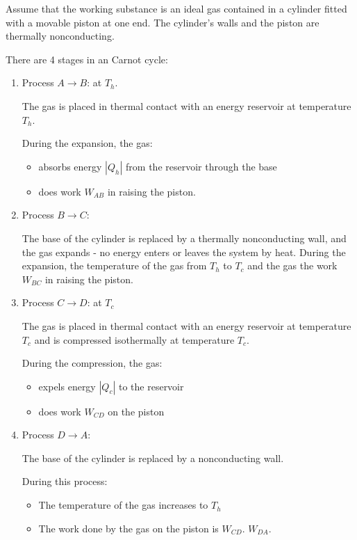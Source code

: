        \par Assume that the working substance is an ideal gas contained in a cylinder
        fitted with a movable piston at one end. The cylinder's walls and the piston
        are thermally nonconducting.
        \par There are 4 stages in an Carnot cycle:
        \begin{enumerate}
            \item Process $A \to B$:  at $T_{h}$.
                \par The gas is placed in thermal contact with an energy reservoir at
                temperature $T_{h}$.
                \par During the expansion, the gas:
                \begin{itemize}
                    \item absorbs energy $|Q_{h}|$ from the reservoir through the base
                    \item does work $W_{AB}$ in raising the piston.
                \end{itemize}
            \item Process $B \to C$: 
                \par The base of the cylinder is replaced by a thermally nonconducting wall,
                and the gas expands  - no energy enters or leaves the
                system by heat. During the expansion, the temperature of the gas
                 from $T_{h}$ to $T_{c}$ and the gas the work $W_{BC}$
                in raising the piston.
            \item Process $C \to D$:  at $T_{c}$
                \par The gas is placed in thermal contact with an energy reservoir at
                temperature $T_{c}$ and is compressed isothermally at temperature
                $T_{c}$.
                \par During the compression, the gas:
                \begin{itemize}
                    \item expels energy $|Q_{c}|$ to the reservoir
                    \item does work $W_{CD}$ on the piston
                \end{itemize}
            \item Process $D \to A$: 
                \par The base of the cylinder is replaced by a nonconducting wall.
                \par During this process:
                \begin{itemize}
                    \item The temperature of the gas increases to $T_{h}$
                    \item The work done by the gas on the piston is $W_{CD}$.
                $W_{DA}$.
                \end{itemize}
        \end{enumerate}

